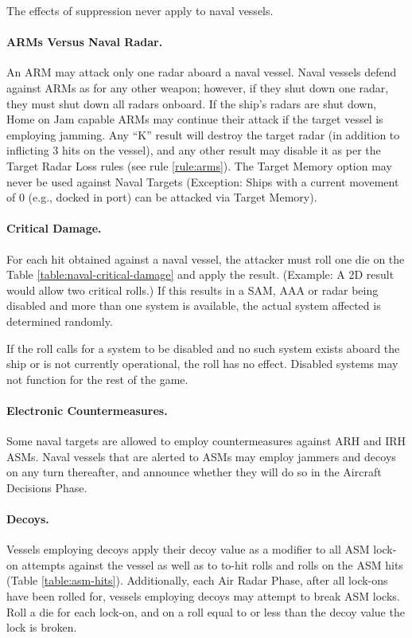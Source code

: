 The effects of suppression never apply to naval vessels. 

\paragraph{ARMs Versus Naval Radar.}  An ARM may attack only one radar aboard a naval vessel.  Naval vessels defend against ARMs as for any other weapon; however, if they shut down one radar, they must shut down all radars onboard.  If the ship's radars are shut down, Home on Jam capable ARMs may continue their attack if the target vessel is employing jamming.   Any “K” result will destroy the target radar (in addition to inflicting 3 hits on the vessel), and any other result may disable it as per the Target Radar Loss rules (see rule \ref{rule:arms}).  The Target Memory option may never be used against Naval Targets (Exception: Ships with a current movement of 0 (e.g., docked in port) can be attacked via Target Memory).


\paragraph{Critical Damage.} For each hit obtained against a naval vessel, the attacker must roll one die on the Table \ref{table:naval-critical-damage} and apply the result.  (Example: A 2D result would allow two critical rolls.)   If this results in a SAM, AAA or radar being disabled and more than one system is available, the actual system affected is determined randomly.

If the roll calls for a system to be disabled and no such system exists aboard the ship or is not currently operational, the roll has no effect.  Disabled systems may not function for the rest of the game.



\paragraph{Electronic Countermeasures.}  Some naval targets are allowed to employ countermeasures against ARH and IRH ASMs.  Naval vessels that are alerted to ASMs may employ jammers and decoys on any turn thereafter, and announce whether they will do so in the Aircraft Decisions Phase.


\paragraph{Decoys.} \label{rule:asm-decoys} Vessels employing decoys apply their decoy value as a modifier to all ASM lock-on attempts against the vessel as well as to to-hit rolls and rolls on the ASM hits (Table \ref{table:asm-hits}).  Additionally, each Air Radar Phase, after all lock-ons have been rolled for, vessels employing decoys may attempt to break ASM locks.   Roll a die for each lock-on, and on a roll equal to or less than the decoy value the lock is broken.

